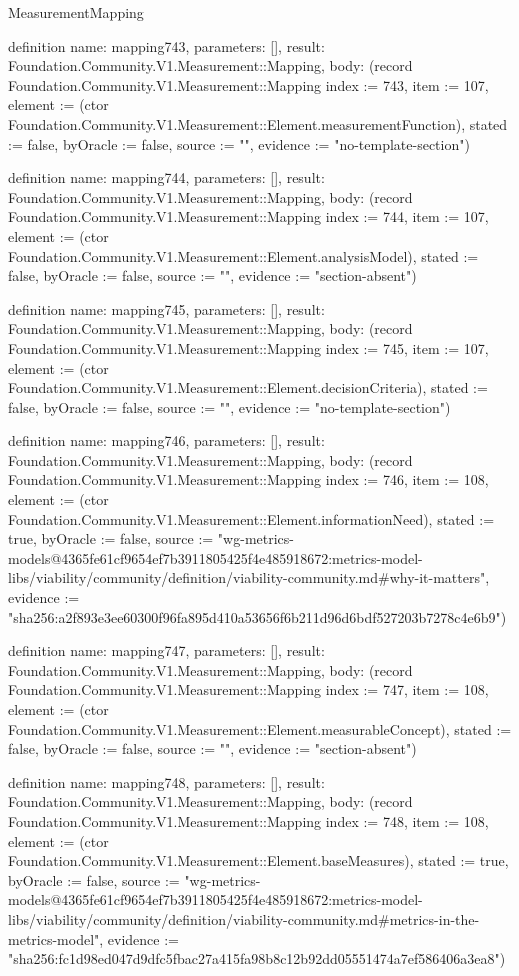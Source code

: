 \begin{lexlean}{MeasurementMapping}
\begin{semanticmodule}
definition{
  name: mapping743,
  parameters: [],
  result: Foundation.Community.V1.Measurement::Mapping,
  body: (record Foundation.Community.V1.Measurement::Mapping {index := 743, item := 107, element := (ctor Foundation.Community.V1.Measurement::Element.measurementFunction), stated := false, byOracle := false, source := "", evidence := "no-template-section"})
}

definition{
  name: mapping744,
  parameters: [],
  result: Foundation.Community.V1.Measurement::Mapping,
  body: (record Foundation.Community.V1.Measurement::Mapping {index := 744, item := 107, element := (ctor Foundation.Community.V1.Measurement::Element.analysisModel), stated := false, byOracle := false, source := "", evidence := "section-absent"})
}

definition{
  name: mapping745,
  parameters: [],
  result: Foundation.Community.V1.Measurement::Mapping,
  body: (record Foundation.Community.V1.Measurement::Mapping {index := 745, item := 107, element := (ctor Foundation.Community.V1.Measurement::Element.decisionCriteria), stated := false, byOracle := false, source := "", evidence := "no-template-section"})
}

definition{
  name: mapping746,
  parameters: [],
  result: Foundation.Community.V1.Measurement::Mapping,
  body: (record Foundation.Community.V1.Measurement::Mapping {index := 746, item := 108, element := (ctor Foundation.Community.V1.Measurement::Element.informationNeed), stated := true, byOracle := false, source := "wg-metrics-models@4365fe61cf9654ef7b3911805425f4e485918672:metrics-model-libs/viability/community/definition/viability-community.md#why-it-matters", evidence := "sha256:a2f893e3ee60300f96fa895d410a53656f6b211d96d6bdf527203b7278c4e6b9"})
}

definition{
  name: mapping747,
  parameters: [],
  result: Foundation.Community.V1.Measurement::Mapping,
  body: (record Foundation.Community.V1.Measurement::Mapping {index := 747, item := 108, element := (ctor Foundation.Community.V1.Measurement::Element.measurableConcept), stated := false, byOracle := false, source := "", evidence := "section-absent"})
}

definition{
  name: mapping748,
  parameters: [],
  result: Foundation.Community.V1.Measurement::Mapping,
  body: (record Foundation.Community.V1.Measurement::Mapping {index := 748, item := 108, element := (ctor Foundation.Community.V1.Measurement::Element.baseMeasures), stated := true, byOracle := false, source := "wg-metrics-models@4365fe61cf9654ef7b3911805425f4e485918672:metrics-model-libs/viability/community/definition/viability-community.md#metrics-in-the-metrics-model", evidence := "sha256:fc1d98ed047d9dfc5fbac27a415fa98b8c12b92dd05551474a7ef586406a3ea8"})
}


\end{semanticmodule}
\end{lexlean}
